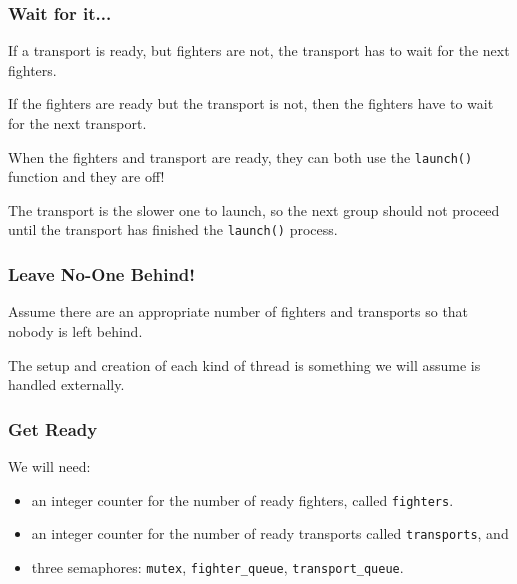 \begin{frame}
\frametitle{Wait for it...}

If a transport is ready, but fighters are not, the transport has to wait for the next fighters. 

If the fighters are ready but the transport is not, then the fighters have to wait for the next transport. 

When the fighters and transport are ready, they can both use the \texttt{launch()} function and they are off! 

The transport is the slower one to launch, so the next group should not proceed until the transport has finished the \texttt{launch()} process.


\end{frame}


\begin{frame}
\frametitle{Leave No-One Behind!}


Assume there are an appropriate number of fighters and transports so that nobody is left behind. 

The setup and creation of each kind of thread is something we will assume is handled externally.

\end{frame}


\begin{frame}
\frametitle{Get Ready}

We will need:

\begin{itemize}
\item an integer counter for the number of ready fighters, called \texttt{fighters}.

\item an integer counter for the number of ready transports called \texttt{transports}, and 
\item three semaphores: \texttt{mutex}, \texttt{fighter\_queue}, \texttt{transport\_queue}.
\end{itemize}


\end{frame}


